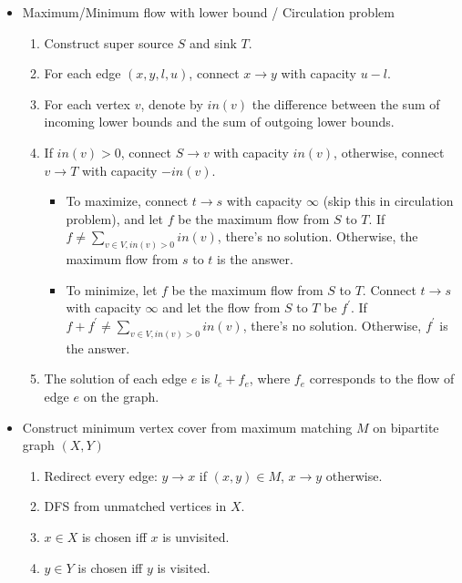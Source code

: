 \begin{itemize}
    \itemsep-0.3em
    \item Maximum/Minimum flow with lower bound / Circulation problem
    \vspace{-1em}
    \begin{enumerate}
        \itemsep-0.3em
        \item Construct super source $S$ and sink $T$.
        \item For each edge $(x, y, l, u)$, connect $x \rightarrow y$ with capacity $u - l$.
        \item For each vertex $v$, denote by $in(v)$ the difference between the sum of incoming lower bounds and the sum of outgoing lower bounds.
        \item If $in(v) > 0$, connect $S \rightarrow v$ with capacity $in(v)$, otherwise, connect $v \rightarrow T$ with capacity $-in(v)$.
        \begin{itemize}
            \itemsep-0.2em
            \item To maximize, connect $t \rightarrow s$ with capacity $\infty$ (skip this in circulation problem), and let $f$ be the maximum flow from $S$ to $T$. If $f \neq \sum_{v \in V, in(v) > 0}{in(v)}$, there's no solution. Otherwise, the maximum flow from $s$ to $t$ is the answer.
            \item To minimize, let $f$ be the maximum flow from $S$ to $T$. Connect $t \rightarrow s$ with capacity $\infty$ and let the flow from $S$ to $T$ be $f^\prime$. If $f + f^\prime \neq \sum_{v \in V, in(v) > 0}{in(v)}$, there's no solution. Otherwise, $f^\prime$ is the answer.
        \end{itemize}
        \item The solution of each edge $e$ is $l_e + f_e$, where $f_e$ corresponds to the flow of edge $e$ on the graph.
    \end{enumerate}
    \item Construct minimum vertex cover from maximum matching $M$ on bipartite graph $(X, Y)$
    \vspace{-1em}
    \begin{enumerate}
        \itemsep-0.3em
        \item Redirect every edge: $y \rightarrow x$ if $(x, y) \in M$, $x \rightarrow y$ otherwise.
        \item DFS from unmatched vertices in $X$.
        \item $x \in X$ is chosen iff $x$ is unvisited.
        \item $y \in Y$ is chosen iff $y$ is visited.

\end{enumerate}
\end{itemize}
